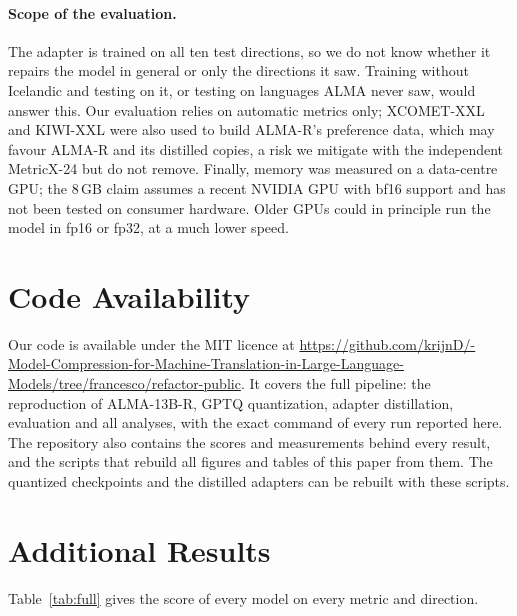 \documentclass[10pt]{article}
\begin{document}
\paragraph{Scope of the evaluation.} The adapter is trained on all ten test
directions, so we do not know whether it repairs the model in general or only
the directions it saw. Training without Icelandic and testing on it, or testing
on languages ALMA never saw, would answer this. Our evaluation relies on
automatic metrics only; XCOMET-XXL and KIWI-XXL were also used to build ALMA-R's
preference data, which may favour ALMA-R and its distilled copies, a risk we
mitigate with the independent MetricX-24 but do not remove. Finally, memory was
measured on a data-centre GPU; the 8\,GB claim assumes a recent NVIDIA GPU with
bf16 support and has not been tested on consumer hardware. Older GPUs could in
principle run the model in fp16 or fp32, at a much lower speed.

\section*{Code Availability}

Our code is available under the MIT licence at
\url{https://github.com/krijnD/-Model-Compression-for-Machine-Translation-in-Large-Language-Models/tree/francesco/refactor-public}.
It covers the full pipeline: the reproduction of ALMA-13B-R, GPTQ quantization,
adapter distillation, evaluation and all analyses, with the exact command of
every run reported here. The repository also contains the scores and
measurements behind every result, and the scripts that rebuild all figures and
tables of this paper from them. The quantized checkpoints and the distilled
adapters can be rebuilt with these scripts.

%



\newpage

\appendix

\section{Additional Results}
\label{app:full}

Table~\ref{tab:full} gives the score of every model on every metric and
direction.


\end{document}
